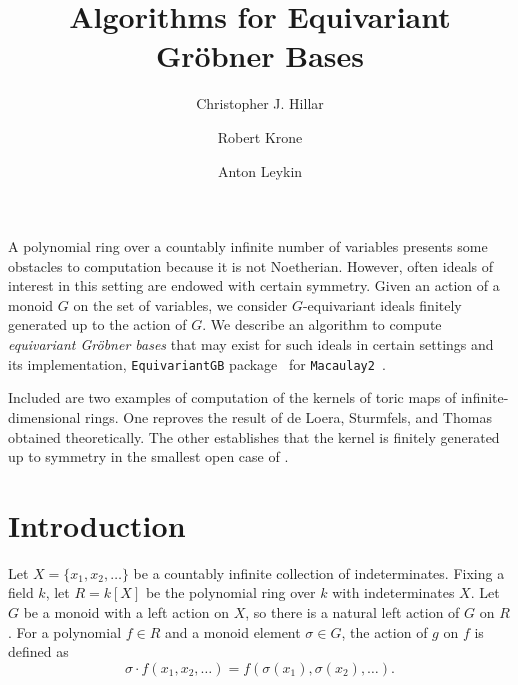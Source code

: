 \documentclass[10pt]{amsart}
\theoremstyle{definition}
\theoremstyle{remark}
\numberwithin{equation}{section}
\newcommand{\<}{\langle}
\renewcommand{\>}{\rangle}
\begin{document}
 \title[Algorithms for Equivariant Gr\"obner Bases]
{Algorithms for Equivariant Gr\"obner Bases}

\author{Christopher J. Hillar}
\address{Redwood Center for Theoretical Neuroscience, University of California, Berkeley}

\author{Robert Krone}
\address{Georgia Institute of Technology, Atlanta, GA}

\author{Anton Leykin}
\address{Georgia Institute of Technology, Atlanta, GA}


%




\maketitle

 A polynomial ring over a countably infinite number of variables presents some obstacles to computation because it is not Noetherian.  However, often ideals of interest in this setting are endowed with certain symmetry.  Given an action of a monoid $G$ on the set of variables, we consider $G$-equivariant ideals finitely generated up to the action of $G$. We describe an algorithm to compute {\em equivariant Gr\"obner bases} that may exist for such ideals in certain settings and its implementation, {\tt EquivariantGB} package~\cite{EquivariantGB} for {\tt Macaulay2}~\cite{M2www}.
 
Included are two examples of computation of the kernels of toric maps of infinite-dimensional rings. One reproves the result of de Loera, Sturmfels, and Thomas~\cite{deLoera-Sturmfels-Thomas} obtained theoretically. The other establishes that the kernel is finitely generated up to symmetry in the smallest open case of \cite[Conjecture 5.10]{Aschenbrenner-Hillar:finite-generation}. 

\section{Introduction}
Let $X = \{x_1,x_2,\ldots\}$ be a countably infinite collection of indeterminates.  Fixing a field $k$, let $R = k[X]$ be the polynomial ring over $k$ with indeterminates $X$.  Let $G$ be a monoid with a left action on $X$, so there is a natural left action of $G$ on $R$.  For a polynomial $f \in R$ and a monoid element $\sigma \in G$, the action of $g$ on $f$ is defined as
 \[ \sigma\cdot f(x_1,x_2,\ldots) = f(\sigma(x_1),\sigma(x_2),\ldots). \]
\end{document}
